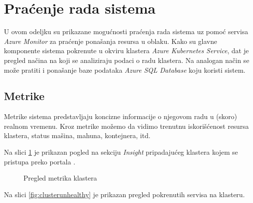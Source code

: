 \documentclass[12pt,oneside]{memoir}
\begin{document}
\section{Praćenje rada sistema}
\label{chp:pracenjemetrika}

U ovom odeljku su prikazane mogućnosti praćenja rada sistema uz pomoć servisa \emph{Azure Monitor} za praćenje ponašanja resursa u oblaku. Kako su glavne komponente sistema pokrenute u okviru klastera \emph{Azure Kubernetes Service}, dat je pregled načina na koji se analiziraju podaci o radu klastera. Na analogan način se može pratiti i ponašanje baze podataka \emph{Azure SQL Database} koju koristi sistem.

\subsection{Metrike}

Metrike sistema predstavljaju koncizne informacije o njegovom radu u (skoro) realnom vremenu. Kroz metrike možemo da vidimo trenutnu iskorišćenost resursa klastera, status mašina, mahuna, kontejnera, itd.

Na slici \ref{fig:aksinsights} je prikazan pogled na sekciju \emph{Insight} pripadajućeg klastera kojem se pristupa preko portala \cite{AzurePortal}.

\begin{figure}[!ht]
  \centering
  \caption{Pregled metrika klastera}
  \label{fig:aksinsights}
\end{figure}

Na slici \ref{fig:clusterunhealthy} je prikazan pregled pokrenutih servisa na klasteru.
\end{document}

